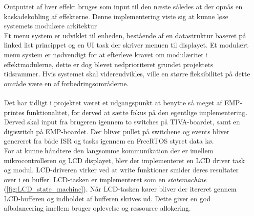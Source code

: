 Outputtet af hver effekt bruges som input til den næste således at der opnås en kaskadekobling af effekterne.
Denne implementering viste sig at kunne løse systemets modulære arkitektur 
\\
Et menu system er udviklet til enheden, bestående af en datastruktur baseret på linked list princippet og en UI task der skriver menuen til displayet.
Et modulært menu system er nødvendigt for at efterleve kravet om modulæritet i effektmodulerne, dette er dog blevet nedprioriteret grundet projektets tidsrammer.
Hvis systemet skal videreudvikles, ville en større fleksibilitet på dette område være en af forbedringsområderne.
\\
\\
Det har tidligt i projektet været et udgangspunkt at benytte så meget af EMP-printes funktionalitet, for derved at sætte fokus på den egentlige implementering. 
Derved skal input fra brugeren igennem to switches på TIVA-boardet, samt en digiswitch på EMP-boardet.
Der bliver pullet på switchene og events bliver genereret fra både ISR og tasks igennem en FreeRTOS styret data kø.
\\
For at kunne håndtere den langsomme kommunikation der er imellem mikrocontrolleren og LCD displayet, blev der implementeret en LCD driver task og modul. 
LCD-driveren virker ved at write funktioner smider deres resultater over i en buffer.
LCD-tasken er implementeret som en \textit{statemachine} (\ref{fig:LCD_state_machine}).
Når LCD-tasken kører bliver der itereret gennem LCD-bufferen og indholdet af bufferen skrives ud.
Dette giver en god afbalancering imellem bruger oplevelse og ressource allokering. 
